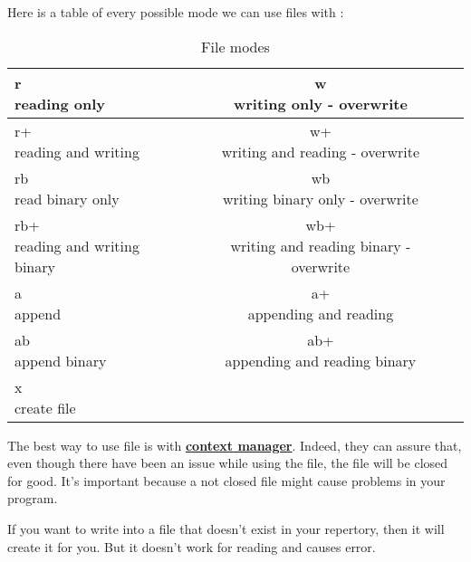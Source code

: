 \documentclass[a4paper, 12pt, titlepage]{scrartcl} %
\begin{document}
Here is a table of every possible mode we can use files with :
\label{subsec:Files}
\begin{table}[h]
\begin{center}
{\renewcommand{\arraystretch}{2}
{\setlength{\tabcolsep}{0.5cm} 
\begin{tabular}{|l|c|r|}
  \hline
  \makecell{r \\ reading only} & \makecell{w \\ writing only - overwrite} \\
  \hline
  \makecell{r+ \\ reading and writing} & \makecell{w+ \\ writing and reading - overwrite} \\
  \hline
  \makecell{rb \\ read binary only} & \makecell{wb \\ writing binary only - overwrite} \\
  \hline
  \makecell{rb+ \\ reading and writing binary} & \makecell{wb+ \\ writing and reading binary - overwrite} \\
  \hline
  \makecell{a \\ append} & \makecell{a+ \\ appending and reading} \\
  \hline
  \makecell{ab \\ append binary} & \makecell{ab+ \\ appending and reading binary} \\
  \hline
  \makecell{x \\ create file} &  \\
  \hline
\end{tabular}}}
\end{center}
\caption{File modes}
\end{table} \vspace{5mm}

The best way to use file is with \hyperref[subsec:ContextManager]{\textbf{context manager}}. Indeed, they can assure that, even though there have been an issue while using the file, the file will be closed for good. It's important because a not closed file might cause problems in your program.

\vspace{5mm}

If you want to write into a file that doesn't exist in your repertory, then it will create it for you. But it doesn't work for reading and causes error.
\end{document}
